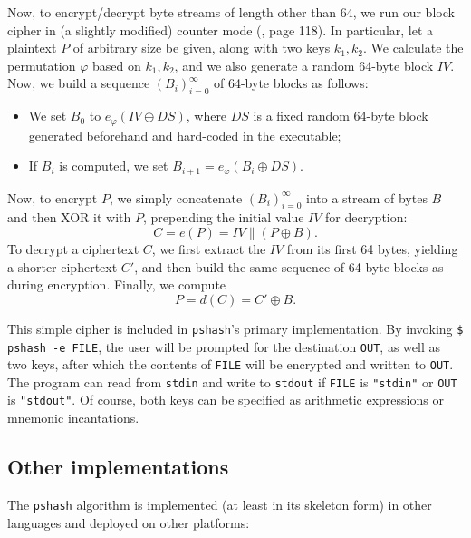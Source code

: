 \documentclass[a4paper, 10pt]{article}
\theoremstyle{plain}
\theoremstyle{definition}
\begin{document}
Now, to encrypt/decrypt byte streams of length other than 64, we run our block cipher in (a slightly modified) counter mode (\cite{serious}, page 118). In particular, let a plaintext $P$ of arbitrary size be given, along with two keys $k_1, k_2$. We calculate the permutation $\varphi$ based on $k_1, k_2$, and we also generate a random 64-byte block $IV$. Now, we build a sequence $(B_i)_{i = 0}^\infty$ of 64-byte blocks as follows:
\begin{itemize}
  \item We set $B_0$ to $e_\varphi (IV \oplus DS)$, where $DS$ is a fixed random 64-byte block generated beforehand and hard-coded in the executable;
  \item If $B_i$ is computed, we set $B_{i+1} = e_\varphi (B_i \oplus DS)$.
\end{itemize}
Now, to encrypt $P$, we simply concatenate $(B_i)_{i = 0}^\infty$ into a stream of bytes $B$ and then XOR it with $P$, prepending the initial value $IV$ for decryption:
\[
  C = e(P) = IV \parallel (P \oplus B).
\]
To decrypt a ciphertext $C$, we first extract the $IV$ from its first 64 bytes, yielding a shorter ciphertext $C'$, and then build the same sequence of 64-byte blocks as during encryption. Finally, we compute
\[
  P = d(C) = C' \oplus B.
\]

This simple cipher is included in \texttt{pshash}'s primary
implementation. By invoking \verb|$ pshash -e FILE|, the user will be
prompted for the destination \verb|OUT|, as well as two keys, after
which the contents of \verb|FILE| will be encrypted and written to \verb|OUT|. The program can read from \texttt{stdin} and write to \texttt{stdout} if \verb|FILE| is \verb|"stdin"| or \verb|OUT| is \verb|"stdout"|. Of course, both keys can be specified as arithmetic expressions or mnemonic incantations.

\subsection{Other implementations}

The \texttt{pshash} algorithm is implemented (at least in its skeleton form) in other languages and deployed on other platforms:
\end{document}
